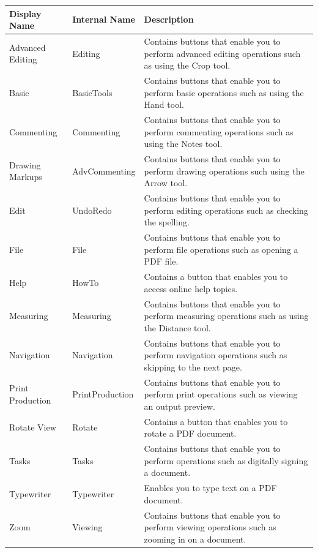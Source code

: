 \documentclass[letterpaper,12pt,english,openany,oneside]{sphinxmanual}
\begin{document}
\begin{savenotes}\sphinxattablestart
\centering
{}\label{\detokenize{Plugins_Toolbutton:section-1}}\nobreak
\begin{tabulary}{\linewidth}[t]{|T|T|T|}
\hline
\sphinxstyletheadfamily 
Display Name
&\sphinxstyletheadfamily 
Internal Name
&\sphinxstyletheadfamily 
Description
\\
\hline
Advanced Editing
&
Editing
&
Contains buttons that enable you to perform advanced editing operations such as using the Crop tool.
\\
\hline
Basic
&
BasicTools
&
Contains buttons that enable you to perform basic operations such as using the Hand tool.
\\
\hline
Commenting
&
Commenting
&
Contains buttons that enable you to perform commenting operations such as using the Notes tool.
\\
\hline
Drawing Markups
&
AdvCommenting
&
Contains buttons that enable you to perform drawing operations such using the Arrow tool.
\\
\hline
Edit
&
UndoRedo
&
Contains buttons that enable you to perform editing operations such as checking the spelling.
\\
\hline
File
&
File
&
Contains buttons that enable you to perform file operations such as opening a PDF file.
\\
\hline
Help
&
HowTo
&
Contains a button that enables you to access online help topics.
\\
\hline
Measuring
&
Measuring
&
Contains buttons that enable you to perform measuring operations such as using the Distance tool.
\\
\hline
Navigation
&
Navigation
&
Contains buttons that enable you to perform navigation operations such as skipping to the next page.
\\
\hline
Print Production
&
PrintProduction
&
Contains buttons that enable you to perform print operations such as viewing an output preview.
\\
\hline
Rotate View
&
Rotate
&
Contains a button that enables you to rotate a PDF document.
\\
\hline
Tasks
&
Tasks
&
Contains buttons that enable you to perform operations such as digitally signing a document.
\\
\hline
Typewriter
&
Typewriter
&
Enables you to type text on a PDF document.
\\
\hline
Zoom
&
Viewing
&
Contains buttons that enable you to perform viewing operations such as zooming in on a document.
\\
\hline
\end{tabulary}
\par
\sphinxattableend\end{savenotes}
\end{document}
